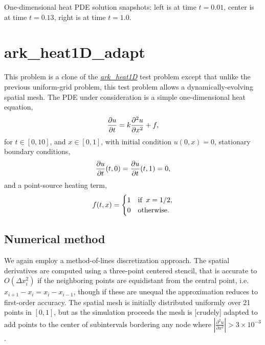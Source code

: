 \documentclass[letterpaper,10pt,english]{sphinxmanual}
\begin{document}
One-dimensional heat PDE solution snapshots: left is at time $t=0.01$,
center is at time $t=0.13$, right is at time $t=1.0$.


\section{ark\_heat1D\_adapt}
\label{c_serial:id28}\label{c_serial:ark-heat1d-adapt}
This problem is a clone of the {\hyperref[c_serial:ark-heat1d]{\emph{ark\_heat1D}}} test problem except that
unlike the previous uniform-grid problem, this test problem allows a
dynamically-evolving spatial mesh.  The PDE under consideration is a
simple one-dimensional heat equation,
\begin{gather}
\begin{split}\frac{\partial u}{\partial t} = k \frac{\partial^2 u}{\partial x^2} + f,\end{split}\notag
\end{gather}
for $t \in [0, 10]$, and $x \in [0, 1]$, with initial
condition $u(0,x) = 0$, stationary boundary conditions,
\begin{gather}
\begin{split}\frac{\partial u}{\partial t}(t,0) = \frac{\partial u}{\partial t}(t,1) = 0,\end{split}\notag
\end{gather}
and a point-source heating term,
\begin{gather}
\begin{split}f(t,x) = \begin{cases} 1 & \text{if}\;\; x=1/2, \\
                       0 & \text{otherwise}. \end{cases}\end{split}\notag
\end{gather}

\subsection{Numerical method}
\label{c_serial:id29}
We again employ a method-of-lines discretization approach.  The
spatial derivatives are computed using a three-point centered stencil,
that is accurate to $O(\Delta x_i^2)$ if the neighboring points are
equidistant from the central point, i.e. $x_{i+1} - x_i = x_i -
x_{i-1}$, though if these are unequal the approximation reduces to
first-order accuracy.  The spatial mesh is initially distributed
uniformly over 21 points in $[0,1]$, but as the simulation
proceeds the mesh is {[}crudely{]} adapted to add points to the center of
subintervals bordering any node where
$\left|\frac{\partial^2 u}{\partial x^2}\right| > 3\times10^{-3}$.
\end{document}
